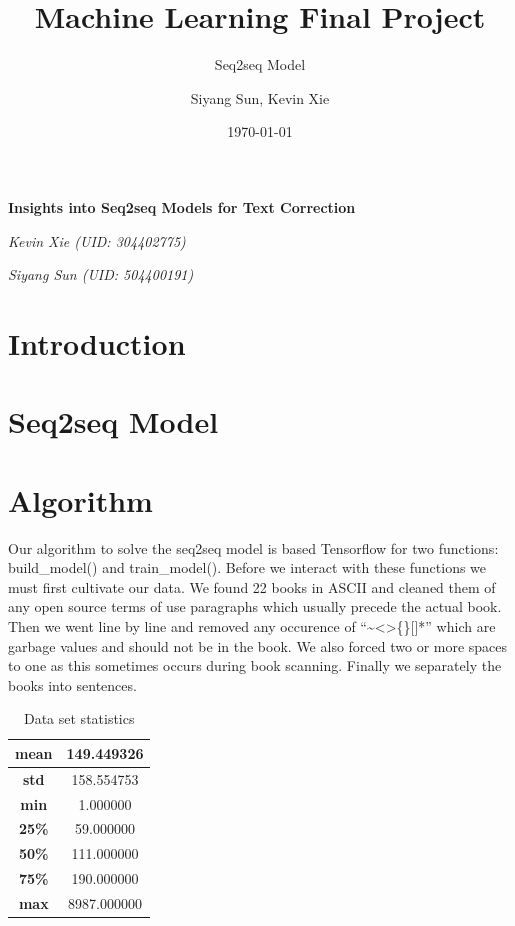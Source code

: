 \documentclass[11pt,a4paper]{scrartcl}
\title{Machine Learning Final Project}
\subtitle{Seq2seq Model}
\author{Siyang Sun, Kevin Xie}
\date{\today}
\theoremstyle{definition}
\begin{document}
\begin{titlepage}
	\centering
	{\Huge\bfseries Insights into Seq2seq Models for Text Correction\par}
	\vspace{7cm}
	{\LARGE\itshape Kevin Xie (UID: 304402775)\par}
	\vspace{.9em}
	{\LARGE\itshape Siyang Sun (UID: 504400191)\par}
	\vspace{.9em}


	\vfill

\end{titlepage}
\tableofcontents

\section{Introduction}


\section{Seq2seq Model}


\section{Algorithm}
Our algorithm to solve the seq2seq model is based Tensorflow for two functions: build\_model() and train\_model(). Before we interact with these functions we must first cultivate our data. We found 22 books in ASCII and cleaned them of any open source terms of use paragraphs which usually precede the actual book. Then we went line by line and removed any occurence of “\textasciitilde<>\{\}[]*” which are garbage values and should not be in the book. We also forced two or more spaces to one as this sometimes occurs during book scanning. Finally we separately the books into sentences.\newline

\FloatBarrier
\begin{table}
\begin{center}
\begin{tabular}{ |c|c|} 
\hline
\textbf{mean} & 149.449326 \\
\hline
\textbf{std} & 158.554753 \\
\hline
\textbf{min} & 1.000000 \\
\hline
\textbf{25\%} & 59.000000 \\
\hline
\textbf{50\%} & 111.000000 \\
\hline
\textbf{75\%} & 190.000000 \\
\hline
\textbf{max} & 8987.000000 \\
\hline
\end{tabular}
\caption{Data set statistics} 
\label{datastats}
\end{center}
\end{table}
\end{document}
